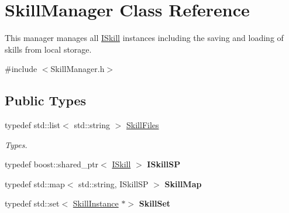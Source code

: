\hypertarget{class_skill_manager}{}\section{Skill\+Manager Class Reference}
\label{class_skill_manager}


This manager manages all \hyperlink{class_i_skill}{I\+Skill} instances including the saving and loading of skills from local storage.  




{\ttfamily \#include $<$Skill\+Manager.\+h$>$}

\subsection*{Public Types}
\begin{DoxyCompactItemize}
\item 
\mbox{\label{class_skill_manager_a380a09a2cb5f00dbe79ba34467abc9ed}} 
typedef std\+::list$<$ std\+::string $>$ \hyperlink{class_skill_manager_a380a09a2cb5f00dbe79ba34467abc9ed}{Skill\+Files}
\begin{DoxyCompactList}\small\item\em Types. \end{DoxyCompactList}\item 
\mbox{\label{class_skill_manager_a1abbbc3ddfdd2a9ae1e84e8bc07b37a2}} 
typedef boost\+::shared\+\_\+ptr$<$ \hyperlink{class_i_skill}{I\+Skill} $>$ {\bfseries I\+Skill\+SP}
\item 
\mbox{\label{class_skill_manager_adbaa615fadbe67a9cbcbdf2131a027ab}} 
typedef std\+::map$<$ std\+::string, I\+Skill\+SP $>$ {\bfseries Skill\+Map}
\item 
\mbox{\label{class_skill_manager_ae55792e637fe8a3fb466aeb0c1bce4f2}} 
typedef std\+::set$<$ \hyperlink{class_skill_instance}{Skill\+Instance} $\ast$$>$ {\bfseries Skill\+Set}
\end{DoxyCompactItemize}

